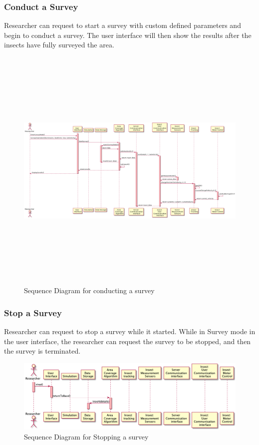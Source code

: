 \documentclass[11pt]{article}
\begin{document}
\subsubsection{Conduct a Survey} 
Researcher can request to start a survey with custom defined parameters and begin to conduct a survey. The user interface will then show the results after the insects have fully surveyed the area.
\begin{figure}[H]
   \centering
   \includegraphics[width=18cm, height=12cm]{diagram/survey.png}
   \caption{Sequence Diagram for conducting a survey}
   \label{fig:stop}
\end{figure}
\subsubsection{Stop a Survey}
Researcher can request to stop a survey while it started. While in Survey mode in the user interface, the researcher can request the survey to be stopped, and then the survey is terminated.
\begin{figure}[H]
   \centering
   \includegraphics[width=\textwidth]{diagram/stopsequence.png}
   \caption{Sequence Diagram for Stopping a survey}
   \label{fig:stop}
\end{figure}
\end{document}
